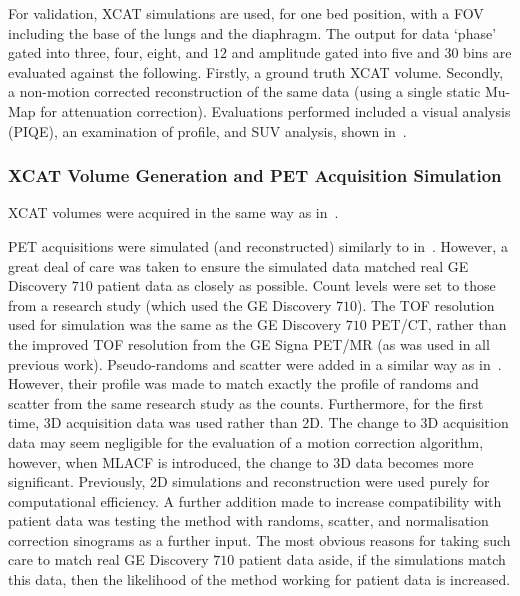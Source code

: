             For validation, \gls{XCAT} simulations are used, for one bed position, with a \gls{FOV} including the base of the lungs and the diaphragm. The output for data `phase' gated into three, four, eight, and $12$ and amplitude gated into five and $30$ bins are evaluated against the following. Firstly, a ground truth \gls{XCAT} volume. Secondly, a non-motion corrected reconstruction of the same data (using a single static \gls{Mu-Map} for attenuation correction). Evaluations performed included a visual analysis (\gls{PIQE}), an examination of profile, and \gls{SUV} analysis, shown in~.
            
            \subsubsection{XCAT Volume Generation and PET Acquisition Simulation} \label{sec:evaluation_of_pet_ct_motion_correction_incorporating_motion_models_using_mlacf_and_complex_gating_schemes_methods_xcat_volume_generation_and_pet_acquisition_simulation}
                \gls{XCAT} volumes were acquired in the same way as in~.

                \gls{PET} acquisitions were simulated (and reconstructed) similarly to in~. However, a great deal of care was taken to ensure the simulated data matched real \gls{GE} Discovery $710$ patient data as closely as possible. Count levels were set to those from a research study (which used the \gls{GE} Discovery $710$). The \gls{TOF} resolution used for simulation was the same as the \gls{GE} Discovery $710$ \gls{PET}/\gls{CT}, rather than the improved \gls{TOF} resolution from the \gls{GE} Signa \gls{PET}/\gls{MR} (as was used in all previous work). Pseudo-randoms and scatter were added in a similar way as in~. However, their profile was made to match exactly the profile of randoms and scatter from the same research study as the counts. Furthermore, for the first time, \gls{3D} acquisition data was used rather than \gls{2D}. The change to \gls{3D} acquisition data may seem negligible for the evaluation of a motion correction algorithm, however, when \gls{MLACF} is introduced, the change to \gls{3D} data becomes more significant. Previously, \gls{2D} simulations and reconstruction were used purely for computational efficiency. A further addition made to increase compatibility with patient data was testing the method with randoms, scatter, and normalisation correction sinograms as a further input. The most obvious reasons for taking such care to match real \gls{GE} Discovery $710$ patient data aside, if the simulations match this data, then the likelihood of the method working for patient data is increased.
                
